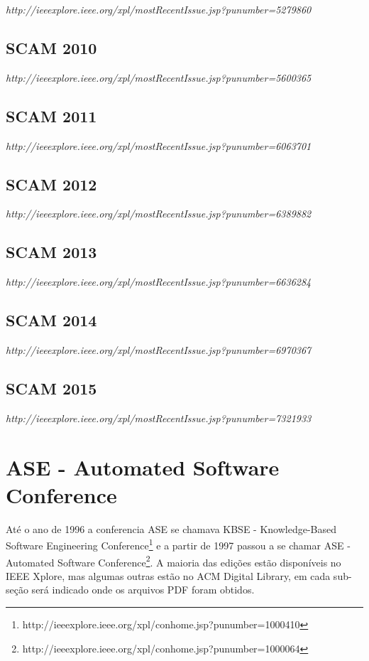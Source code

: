 {\small \em http://ieeexplore.ieee.org/xpl/mostRecentIssue.jsp?punumber=5279860}

\subsection{SCAM 2010}

{\small \em http://ieeexplore.ieee.org/xpl/mostRecentIssue.jsp?punumber=5600365}

\subsection{SCAM 2011}

{\small \em http://ieeexplore.ieee.org/xpl/mostRecentIssue.jsp?punumber=6063701}

\subsection{SCAM 2012}

{\small \em http://ieeexplore.ieee.org/xpl/mostRecentIssue.jsp?punumber=6389882}

\subsection{SCAM 2013}

{\small \em http://ieeexplore.ieee.org/xpl/mostRecentIssue.jsp?punumber=6636284}

\subsection{SCAM 2014}

{\small \em http://ieeexplore.ieee.org/xpl/mostRecentIssue.jsp?punumber=6970367}

\subsection{SCAM 2015}

{\small \em http://ieeexplore.ieee.org/xpl/mostRecentIssue.jsp?punumber=7321933}

\section{ASE - Automated Software Conference}

Até o ano de 1996 a conferencia ASE se chamava KBSE - Knowledge-Based Software
Engineering
Conference\footnote{http://ieeexplore.ieee.org/xpl/conhome.jsp?punumber=1000410}
e a partir de 1997 passou a se chamar ASE - Automated Software
Conference\footnote{http://ieeexplore.ieee.org/xpl/conhome.jsp?punumber=1000064}.
A maioria das edições estão disponíveis no IEEE Xplore, mas algumas outras
estão no ACM Digital Library, em cada sub-seção será indicado onde os arquivos
PDF foram obtidos.

